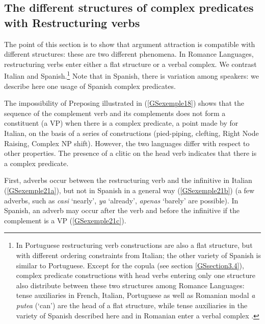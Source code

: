 \documentclass[output=paper]{langsci/langscibook}
\begin{document}
{\subsection{The different structures of complex predicates with Restructuring verbs} \label{GSsection3.2}

The point of this section is to show that argument attraction is compatible with different structures: these are two different phenomena. In Romance Languages, restructuring verbs enter either a flat structure or a verbal complex. We contrast Italian and Spanish.\footnote{In Portuguese restructuring verb constructions are also a flat structure, but with different ordering constraints from Italian; the other variety of Spanish is similar to Portuguese. Except for the copula (see section \ref{GSsection3.4}), complex predicate constructions with head verbs entering only one structure also distribute between these two structures among Romance Languages: tense auxiliaries in French, Italian, Portuguese as well as Romanian modal \textit{a putea} (`can') are the head of a flat structure, while tense auxiliaries in the variety of Spanish described here and in Romanian enter a verbal complex \citep{AG2010}.} Note that in Spanish, there is variation among speakers: we describe here one usage of Spanish complex predicates. 

The impossibility of Preposing illustrated in (\ref{GSexemple18}) shows that the sequence of the complement verb and its complements does not form a constituent (a VP) when there is a complex predicate, a point made by \cite{rizzi1982issues} for Italian, on the basis of a series of constructions (pied-piping, clefting, Right Node Raising, Complex NP shift). However, the two languages differ with respect to other properties. The presence of a clitic on the head verb indicates that there is a complex predicate.
 
First, adverbs occur between the restructuring verb and the infinitive in Italian (\ref{GSexemple21a}), but not in Spanish in a general way (\ref{GSexemple21b}) (a few adverbs, such as \textit{casi} `nearly', \textit{ya} `already', \textit{apenas} `barely' are possible). In Spanish, an adverb may occur after the verb and before the infinitive if the complement is a VP (\ref{GSexemple21c}).

\begin{exe}
	\ex \label{GSexemple21} 
	\begin{xlist}
        \label{GSexemple21a}


\end{xlist}
\end{exe}}
\end{document}

